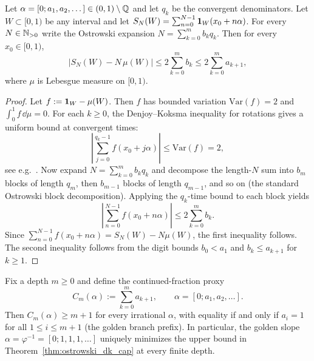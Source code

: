 \begin{theorem}
\label{thm:ostrowski_dk_cap}
Let $\alpha=[0;a_1,a_2,\dots]\in(0,1)\setminus\mathbb{Q}$ and let $q_k$ be the convergent denominators.
Let $W\subset[0,1)$ be any interval and let $S_N(W)=\sum_{n=0}^{N-1}\mathbf{1}_W(x_0+n\alpha)$.
For every $N\in\mathbb{N}_{>0}$ write the Ostrowski expansion $N=\sum_{k=0}^m b_k q_k$.
Then for every $x_0\in[0,1)$,
\begin{equation}
  \left|S_N(W) - N\,\mu(W)\right|
  \le 2\sum_{k=0}^m b_k
  \le 2\sum_{k=0}^m a_{k+1},
\end{equation}
where $\mu$ is Lebesgue measure on $[0,1)$.
\end{theorem}

\begin{proof}
Let $f:=\mathbf{1}_W-\mu(W)$. Then $f$ has bounded variation $\mathrm{Var}(f)=2$ and $\int_0^1 f\,\dd\mu=0$.
For each $k\ge 0$, the Denjoy--Koksma inequality for rotations gives a uniform bound at convergent times:
\begin{equation}
  \left|\sum_{j=0}^{q_k-1} f(x_0+j\alpha)\right|\le \mathrm{Var}(f)=2,
\end{equation}
see e.g.\ \cite{Denjoy1932,Koksma1935,KatokHasselblatt1995}.
Now expand $N=\sum_{k=0}^m b_k q_k$ and decompose the length-$N$ sum into $b_m$ blocks of length $q_m$, then $b_{m-1}$ blocks of length $q_{m-1}$, and so on (the standard Ostrowski block decomposition).
Applying the $q_k$-time bound to each block yields
\begin{equation}
  \left|\sum_{n=0}^{N-1} f(x_0+n\alpha)\right|
  \le 2\sum_{k=0}^m b_k.
\end{equation}
Since $\sum_{n=0}^{N-1} f(x_0+n\alpha)=S_N(W)-N\mu(W)$, the first inequality follows.
The second inequality follows from the digit bounds $b_0<a_1$ and $b_k\le a_{k+1}$ for $k\ge 1$.
\end{proof}

\begin{corollary}
\label{cor:golden_proxy_cap}
Fix a depth $m\ge 0$ and define the continued-fraction proxy
\begin{equation}
  C_m(\alpha):=\sum_{k=0}^m a_{k+1},
  \qquad \alpha=[0;a_1,a_2,\dots].
\end{equation}
Then $C_m(\alpha)\ge m+1$ for every irrational $\alpha$, with equality if and only if $a_i=1$ for all $1\le i\le m+1$ (the golden branch prefix).
In particular, the golden slope $\alpha=\varphi^{-1}=[0;1,1,1,\dots]$ uniquely minimizes the upper bound in Theorem~\ref{thm:ostrowski_dk_cap} at every finite depth.
\end{corollary}


